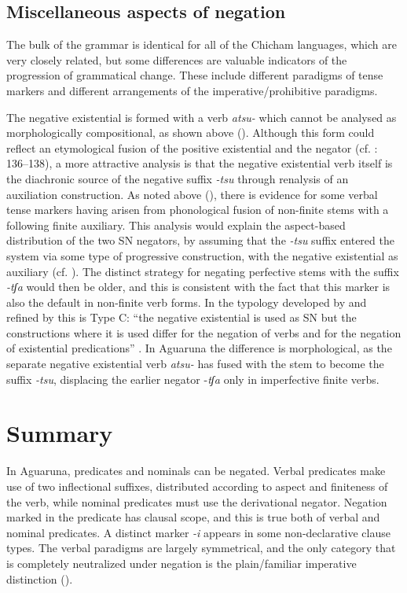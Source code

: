 \documentclass[output=paper,colorlinks,citecolor=brown,draft]{langscibook}
\begin{document}
\subsection{Miscellaneous aspects of negation}\label{sec:agu:4.6}
\largerpage
The bulk of the grammar is identical for all of the Chicham languages, which are very closely related, but some differences are valuable indicators of the progression of grammatical change. These include different paradigms of tense markers and different arrangements of the imperative/prohibitive paradigms.

The negative existential is formed with a verb \textit{atsu-} which cannot be analysed as morphologically compositional, as shown above (). Although this form could reflect an etymological fusion of the positive existential and the negator (cf. \citealt{Veselinova2013neg.exist}: 136–138), a more attractive analysis is that the negative existential verb itself is the diachronic source of the negative suffix \textit{{}-tsu} through renalysis of an auxiliation construction. As noted above (), there is evidence for some verbal tense markers having arisen from phonological fusion of non-finite stems with a following finite auxiliary. This analysis would explain the aspect-based distribution of the two SN negators, by assuming that the \textit{{}-tsu} suffix entered the system via some type of progressive construction, with the negative existential as auxiliary (cf. \citealt{Croft1991}). The distinct strategy for negating perfective stems with the suffix \textit{{}-tʃa} would then be older, and this is consistent with the fact that this marker is also the default in non-finite verb forms. In the typology developed by \citet{Croft1991} and refined by \citet{Veselinova2016} this is Type C: “the negative existential is used as SN but the constructions where it is used differ for the negation of verbs and for the negation of existential predications” \citep[144]{Veselinova2016}. In Aguaruna the difference is morphological, as the separate negative existential verb \textit{atsu-} has fused with the stem to become the suffix \textit{{}-tsu}, displacing the earlier negator -\textit{tʃa} only in imperfective finite verbs.

\section{Summary}\label{sec:agu:5}

In Aguaruna, predicates and nominals can be negated. Verbal predicates make use of two inflectional suffixes, distributed according to aspect and finiteness of the verb, while nominal predicates must use the derivational negator. Negation marked in the predicate has clausal scope, and this is true both of verbal and nominal predicates. A distinct marker \textit{{}-i} appears in some non-declarative clause types. The verbal paradigms are largely symmetrical, and the only category that is completely neutralized under negation is the plain/familiar imperative distinction ().
\end{document}
